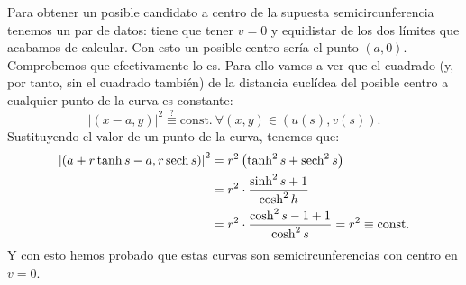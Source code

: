 Para obtener un posible candidato a centro de la supuesta semicircunferencia
tenemos un par de datos: tiene que tener $v = 0$ y equidistar de los dos límites
que acabamos de calcular. Con esto un posible centro sería el punto $\left( a, 0
\right)$. Comprobemos que efectivamente lo es. Para ello vamos a ver que el
cuadrado (y, por tanto, sin el cuadrado también) de la distancia euclídea del
posible centro a cualquier punto de la curva es constante:
\[
\left\lvert \left( x - a , y \right) \right\rvert^2 \stackrel{?}{\equiv}
\mathrm{const.}\ \forall \left( x, y \right) \in \left( u\left( s \right), v\left( s
\right) \right).
\]
Sustituyendo el valor de un punto de la curva, tenemos que:
\begin{align*}
    \left\lvert \left( a + r \tanh s - a, r \operatorname{sech} s \right) \right\rvert^2 &=
    r^2 \left( \tanh^2 s + \operatorname{sech}^2 s \right)\\ 
    &= r^2 \cdot \frac{\sinh^2 s + 1}{\cosh^2 h}\\
    &= r^2 \cdot \frac{\cosh^2 s - 1 + 1}{\cosh^2 s} = r^2 \equiv \mathrm{const.}
\end{align*}
Y con esto hemos probado que estas curvas son semicircunferencias con centro
en $v = 0$.

